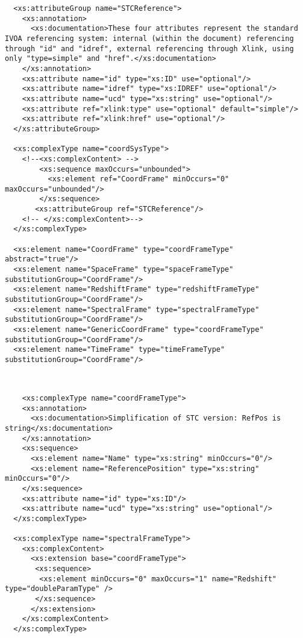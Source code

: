{\begin{flushleft}
\begin{fmppage}
\begin{verbatim}
  <xs:attributeGroup name="STCReference">
    <xs:annotation>
      <xs:documentation>These four attributes represent the standard IVOA referencing system: internal (within the document) referencing through "id" and "idref", external referencing through Xlink, using only "type=simple" and "href".</xs:documentation>
    </xs:annotation>
    <xs:attribute name="id" type="xs:ID" use="optional"/>
    <xs:attribute name="idref" type="xs:IDREF" use="optional"/>
    <xs:attribute name="ucd" type="xs:string" use="optional"/>
    <xs:attribute ref="xlink:type" use="optional" default="simple"/>
    <xs:attribute ref="xlink:href" use="optional"/>
  </xs:attributeGroup>

  <xs:complexType name="coordSysType">
    <!--<xs:complexContent> -->
        <xs:sequence maxOccurs="unbounded">
          <xs:element ref="CoordFrame" minOccurs="0" maxOccurs="unbounded"/>
        </xs:sequence>
       <xs:attributeGroup ref="STCReference"/>
    <!-- </xs:complexContent>-->
  </xs:complexType>

  <xs:element name="CoordFrame" type="coordFrameType" abstract="true"/>
  <xs:element name="SpaceFrame" type="spaceFrameType" substitutionGroup="CoordFrame"/>
  <xs:element name="RedshiftFrame" type="redshiftFrameType" substitutionGroup="CoordFrame"/>
  <xs:element name="SpectralFrame" type="spectralFrameType" substitutionGroup="CoordFrame"/> 
  <xs:element name="GenericCoordFrame" type="coordFrameType" substitutionGroup="CoordFrame"/>
  <xs:element name="TimeFrame" type="timeFrameType" substitutionGroup="CoordFrame"/>

\end{verbatim}
\end{fmppage}

\begin{fmppage}
\begin{verbatim}


    <xs:complexType name="coordFrameType">
    <xs:annotation>
      <xs:documentation>Simplification of STC version: RefPos is string</xs:documentation>
    </xs:annotation>
    <xs:sequence>
      <xs:element name="Name" type="xs:string" minOccurs="0"/>
      <xs:element name="ReferencePosition" type="xs:string" minOccurs="0"/>
    </xs:sequence>
    <xs:attribute name="id" type="xs:ID"/>
    <xs:attribute name="ucd" type="xs:string" use="optional"/>
  </xs:complexType>

  <xs:complexType name="spectralFrameType">
    <xs:complexContent>
      <xs:extension base="coordFrameType">
       <xs:sequence>
        <xs:element minOccurs="0" maxOccurs="1" name="Redshift" type="doubleParamType" />
       </xs:sequence>
      </xs:extension>
    </xs:complexContent>
  </xs:complexType>




\end{verbatim}
\end{fmppage}
\end{flushleft}}
